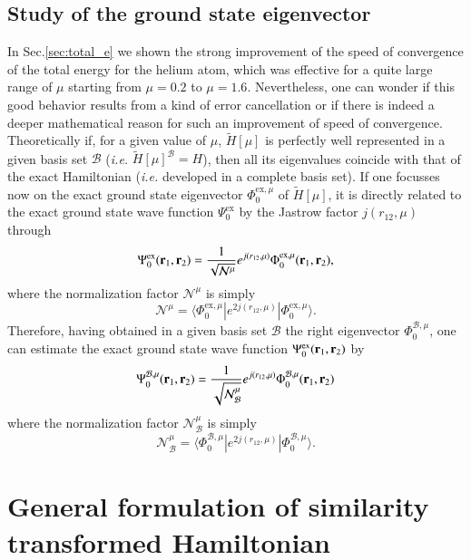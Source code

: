 \documentclass[aip,jcp,reprint,noshowkeys,superscriptaddress]{revtex4-1}
\newcommand{\matelem}[3]{\langle #1 | #2 | #3 \rangle}
\newcommand{\br}[0]{{\bf {r}}}
\newcommand{\psiex}[0]{\Psi^{\text{ex}}_0}
\newcommand{\phimu}[0]{\Phi^{\text{ex},\mu}_0}
\newcommand{\phimub}[0]{\Phi^{\mathcal{B},\mu}_0}
\newcommand{\psimub}[0]{\Psi^{\mathcal{B},\mu}_0}
\newcommand{\basis}[0]{\mathcal{B}}
\begin{document}
\subsection{Study of the ground state eigenvector}
In Sec.\ref{sec:total_e} we shown the strong improvement of the speed of convergence of the total energy for the helium atom, which was effective for a quite large range of $\mu$ starting from $\mu=0.2$ to $\mu=1.6$. 
Nevertheless, one can wonder if this good behavior results from a kind of error cancellation or if there is indeed a deeper mathematical reason for such an improvement of speed of convergence. 
Theoretically if, for a given value of $\mu$, $\tilde{H}[\mu]$ is perfectly well represented in a given basis set $\mathcal{B}$ (\textit{i.e.} $\tilde{H}[\mu]^{\basis} = H$), then all its eigenvalues coincide with that of the exact Hamiltonian (\textit{i.e.} developed in a complete basis set). If one focusses now on the exact ground state eigenvector $\phimu$ of $\tilde{H}[\mu]$, it is directly related to the exact ground state wave function $\psiex$ by the Jastrow factor $j(r_{12},\mu)$ through 
\begin{equation}
 \psiex(\br{}_1,\br{}_2) =  \frac{1}{\sqrt{\mathcal{N}^{\mu}}} e^{j(r_{12},\mu)} \phimu(\br{}_1,\br{}_2), 
\end{equation}
where the normalization factor $\mathcal{N}^{\mu}$ is simply 
\begin{equation}
  \mathcal{N}^{\mu} = \matelem{\phimu}{e^{2 j(r_{12},\mu)}}{\phimu}.
\end{equation}
Therefore, having obtained in a given basis set $\basis$ the right eigenvector $\phimub$, one can estimate the exact ground state wave function $\psiex(\br{}_1,\br{}_2)$ by 
\begin{equation}
 \psimub(\br{}_1,\br{}_2) = \frac{1}{\sqrt{\mathcal{N}_{\basis}^{\mu}}}e^{j(r_{12},\mu)}\phimub(\br{}_1,\br{}_2)
\end{equation}
where the normalization factor $\mathcal{N}_{\basis}^{\mu}$ is simply
\begin{equation}
  \mathcal{N}_{\basis}^{\mu} = \matelem{\phimub}{e^{2 j(r_{12},\mu)}}{\phimub}.
\end{equation}

\section{General formulation of similarity transformed Hamiltonian}
\end{document}
